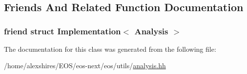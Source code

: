\subsection{Friends And Related Function Documentation}
\hypertarget{classeos_1_1Analysis_a63c3ad7e46dc3c7d599fe2faf2a2f55f}{
\subsubsection[{Implementation$<$ Analysis $>$}]{\setlength{\rightskip}{0pt plus 5cm}friend struct Implementation$<$ {\bf Analysis} $>$}}
\label{classeos_1_1Analysis_a63c3ad7e46dc3c7d599fe2faf2a2f55f}


The documentation for this class was generated from the following file:\begin{DoxyCompactItemize}
\item 
/home/alexshires/EOS/eos-\/next/eos/utils/\hyperlink{analysis_8hh}{analysis.hh}\end{DoxyCompactItemize}
